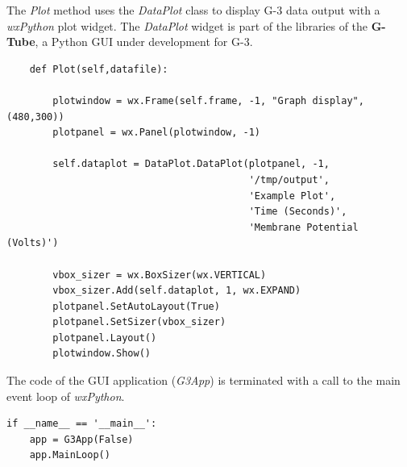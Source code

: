 \documentclass[12pt]{article}
\begin{document}



The {\it Plot} method uses the {\it DataPlot} class to display G-3 data
output with a {\it wxPython} plot widget.  The {\it DataPlot} widget
is part of the libraries of the {\bf G-Tube}, a Python GUI under
development for G-3.

{\footnotesize
  \linenumbers
\begin{verbatim} 
    def Plot(self,datafile):

        plotwindow = wx.Frame(self.frame, -1, "Graph display", (480,300))
        plotpanel = wx.Panel(plotwindow, -1)

        self.dataplot = DataPlot.DataPlot(plotpanel, -1,
                                          '/tmp/output',
                                          'Example Plot',
                                          'Time (Seconds)',
                                          'Membrane Potential (Volts)')

        vbox_sizer = wx.BoxSizer(wx.VERTICAL)
        vbox_sizer.Add(self.dataplot, 1, wx.EXPAND)
        plotpanel.SetAutoLayout(True)
        plotpanel.SetSizer(vbox_sizer)
        plotpanel.Layout()
        plotwindow.Show()
\end{verbatim}
}

The code of the GUI application ({\it G3App}) is terminated with a
call to the main event loop of {\it wxPython}.


{\footnotesize
  \linenumbers
\begin{verbatim}
if __name__ == '__main__':
    app = G3App(False)
    app.MainLoop()
\end{verbatim}
}

%
%

\end{document}
